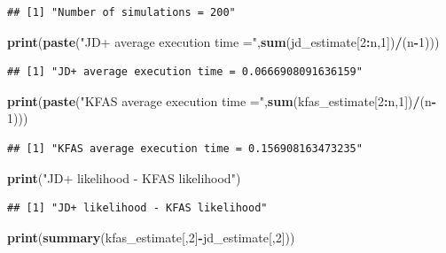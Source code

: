 \documentclass[]{article}
\newenvironment{Shaded}{\begin{snugshade}}{\end{snugshade}}
\newcommand{\KeywordTok}[1]{\textcolor[rgb]{0.13,0.29,0.53}{\textbf{#1}}}
\newcommand{\DecValTok}[1]{\textcolor[rgb]{0.00,0.00,0.81}{#1}}
\newcommand{\StringTok}[1]{\textcolor[rgb]{0.31,0.60,0.02}{#1}}
\newcommand{\OperatorTok}[1]{\textcolor[rgb]{0.81,0.36,0.00}{\textbf{#1}}}
\newcommand{\NormalTok}[1]{#1}
\begin{document}
\begin{verbatim}
## [1] "Number of simulations = 200"
\end{verbatim}

\begin{Shaded}
\begin{Highlighting}[]
\KeywordTok{print}\NormalTok{(}\KeywordTok{paste}\NormalTok{(}\StringTok{"JD+ average execution time ="}\NormalTok{,}\KeywordTok{sum}\NormalTok{(jd_estimate[}\DecValTok{2}\OperatorTok{:}\NormalTok{n,}\DecValTok{1}\NormalTok{])}\OperatorTok{/}\NormalTok{(n}\OperatorTok{-}\DecValTok{1}\NormalTok{)))}
\end{Highlighting}
\end{Shaded}

\begin{verbatim}
## [1] "JD+ average execution time = 0.0666908091636159"
\end{verbatim}

\begin{Shaded}
\begin{Highlighting}[]
\KeywordTok{print}\NormalTok{(}\KeywordTok{paste}\NormalTok{(}\StringTok{"KFAS average execution time ="}\NormalTok{,}\KeywordTok{sum}\NormalTok{(kfas_estimate[}\DecValTok{2}\OperatorTok{:}\NormalTok{n,}\DecValTok{1}\NormalTok{])}\OperatorTok{/}\NormalTok{(n}\OperatorTok{-}\DecValTok{1}\NormalTok{)))}
\end{Highlighting}
\end{Shaded}

\begin{verbatim}
## [1] "KFAS average execution time = 0.156908163473235"
\end{verbatim}

\begin{Shaded}
\begin{Highlighting}[]
\KeywordTok{print}\NormalTok{(}\StringTok{"JD+ likelihood - KFAS likelihood"}\NormalTok{)}
\end{Highlighting}
\end{Shaded}

\begin{verbatim}
## [1] "JD+ likelihood - KFAS likelihood"
\end{verbatim}

\begin{Shaded}
\begin{Highlighting}[]
\KeywordTok{print}\NormalTok{(}\KeywordTok{summary}\NormalTok{(kfas_estimate[,}\DecValTok{2}\NormalTok{]}\OperatorTok{-}\NormalTok{jd_estimate[,}\DecValTok{2}\NormalTok{]))}
\end{Highlighting}
\end{Shaded}
\end{document}
